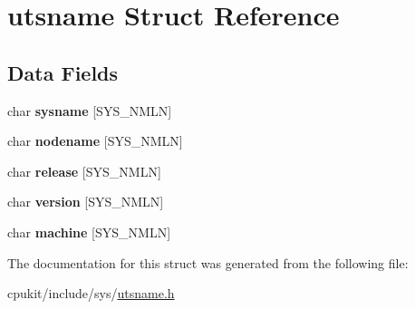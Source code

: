 \hypertarget{structutsname}{}\section{utsname Struct Reference}
\label{structutsname}
\subsection*{Data Fields}
\begin{DoxyCompactItemize}
\item 
\mbox{\label{structutsname_acb7efd42e096d4656c77c94e1c3d30f8}} 
char {\bfseries sysname} \mbox{[}S\+Y\+S\+\_\+\+N\+M\+LN\mbox{]}
\item 
\mbox{\label{structutsname_ac9cad4fec65dba96257ce2e8a5146f15}} 
char {\bfseries nodename} \mbox{[}S\+Y\+S\+\_\+\+N\+M\+LN\mbox{]}
\item 
\mbox{\label{structutsname_a269309871966cf52d5df5b53a07cdac1}} 
char {\bfseries release} \mbox{[}S\+Y\+S\+\_\+\+N\+M\+LN\mbox{]}
\item 
\mbox{\label{structutsname_a7ca068e2a89be6c20dadcdd1440908e7}} 
char {\bfseries version} \mbox{[}S\+Y\+S\+\_\+\+N\+M\+LN\mbox{]}
\item 
\mbox{\label{structutsname_aa565c8d0e7eeb4f06f18cf69df31dfbf}} 
char {\bfseries machine} \mbox{[}S\+Y\+S\+\_\+\+N\+M\+LN\mbox{]}
\end{DoxyCompactItemize}


The documentation for this struct was generated from the following file\+:\begin{DoxyCompactItemize}
\item 
cpukit/include/sys/\mbox{\hyperlink{utsname_8h}{utsname.\+h}}\end{DoxyCompactItemize}
